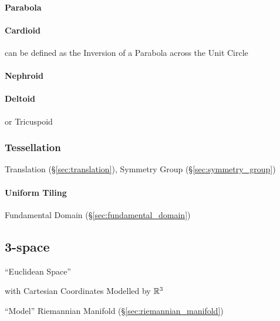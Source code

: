 \paragraph{Parabola}\label{sec:parabola}\hfill

\paragraph{Cardioid}\label{sec:cardioid}\hfill

can be defined as the Inversion of a Parabola across the Unit Circle

\paragraph{Nephroid}\label{sec:nephroid}\hfill

\paragraph{Deltoid}\label{sec:deltoid}\hfill

or Tricuspoid



\subsubsection{Tessellation}\label{sec:tessellation}

\fist Translation (\S\ref{sec:translation}), Symmetry Group
(\S\ref{sec:symmetry_group})



\paragraph{Uniform Tiling}\label{sec:uniform_tiling}\hfill

Fundamental Domain (\S\ref{sec:fundamental_domain})



\subsection{3-space}\label{sec:3_space}

``Euclidean Space''

with Cartesian Coordinates Modelled by $\mathbb{R}^3$

``Model'' Riemannian Manifold (\S\ref{sec:riemannian_manifold})

